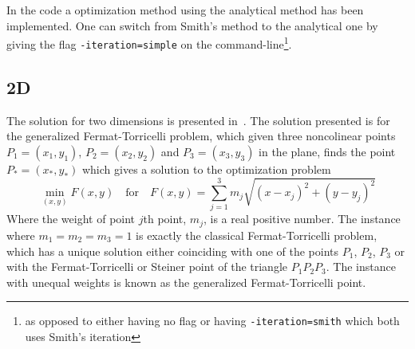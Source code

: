 In the code a optimization method using the analytical method has been
implemented. One can switch from Smith's method to the analytical one by giving
the flag \texttt{-iteration=simple} on the command-line\footnote{as opposed to
  either having no flag or having \texttt{-iteration=smith} which both uses
  Smith's iteration}.

\subsection{2D}
\label{sec:2d}

The solution for two dimensions is presented in~\cite{Uteshev2012}.  The solution
presented is for the generalized Fermat-Torricelli problem, which given three
noncolinear points $P_1 = (x_1, y_1)$, $P_2 = (x_2, y_2)$ and $P_3 = (x_3, y_3)$
in the plane, finds the point $P_\ast = (x_\ast, y_\ast)$ which gives a solution
to the optimization problem
%
\begin{equation}
  \min_{(x,y)} F(x,y) \quad \text{for} \quad F(x,y) = \sum_{j=1}^3 m_j
  \sqrt{{(x-x_j)}^2 + {(y-y_j)}^2}
\end{equation}
%
Where the weight of point $j$th point, $m_j$, is a real positive number.  The
instance where $m_1 = m_2 = m_3 = 1$ is exactly the classical Fermat-Torricelli
problem, which has a unique solution either coinciding with one of the points
$P_1$, $P_2$, $P_3$ or with the Fermat-Torricelli or Steiner point of the
triangle $P_1 P_2 P_3$.  The instance with unequal weights is known as the
generalized Fermat-Torricelli point.

